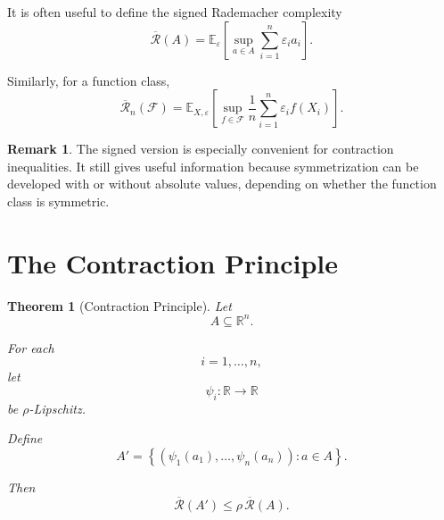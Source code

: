 \documentclass[12pt,oneside]{book}
\numberwithin{equation}{section}
\theoremstyle{definition}
\newtheorem{remark}{Remark}[section]
\theoremstyle{plain}
\newtheorem{theorem}{Theorem}[section]
\theoremstyle{remark}
\newcommand{\R}{\mathbb{R}}
\newcommand{\E}{\mathbb{E}}
\begin{document}
It is often useful to define the signed Rademacher complexity
\[
\overline{\mathcal{R}}(A)
=
\E_\varepsilon
\left[
\sup_{a\in A}
\sum_{i=1}^n
\varepsilon_i a_i
\right].
\]

Similarly, for a function class,
\[
\overline{\mathcal{R}}_n(\mathcal{F})
=
\E_{X,\varepsilon}
\left[
\sup_{f\in\mathcal{F}}
\frac{1}{n}
\sum_{i=1}^n
\varepsilon_i f(X_i)
\right].
\]

\begin{remark}
The signed version is especially convenient for contraction inequalities. It still gives useful information because symmetrization can be developed with or without absolute values, depending on whether the function class is symmetric.
\end{remark}

\section{The Contraction Principle}

\begin{theorem}[Contraction Principle]
Let
\[
A\subseteq\R^n.
\]

For each
\[
i=1,\dots,n,
\]
let
\[
\psi_i:\R\to\R
\]
be $\rho$-Lipschitz.

Define
\[
A'
=
\left\{
(\psi_1(a_1),\dots,\psi_n(a_n)):a\in A
\right\}.
\]

Then
\[
\overline{\mathcal{R}}(A')
\leq
\rho\,
\overline{\mathcal{R}}(A).
\]
\end{theorem}
\end{document}
